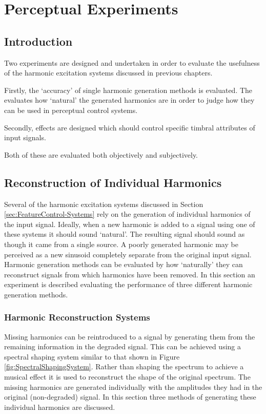 \chapter{Perceptual Experiments}
\label{chap:PerceptualExperiments}

\section{Introduction}
\label{sec:PerceptualExperiments-Introduction}
	\note
	{
		Two experiments are designed and undertaken in order to evaluate the usefulness of the harmonic excitation
		systems discussed in previous chapters.

		Firstly, the `accuracy' of single harmonic generation methods is evaluated. The evaluates how `natural' the
		generated harmonics are in order to judge how they can be used in perceptual control systems.

		Secondly, effects are designed which should control specific timbral attributes of input signals.

		Both of these are evaluated both objectively and subjectively.
	}

\section{Reconstruction of Individual Harmonics}
\label{sec:PerceptualExperiments-Reconstruction}
	Several of the harmonic excitation systems discussed in Section \ref{sec:FeatureControl-Systems} rely on the
	generation of individual harmonics of the input signal. Ideally, when a new harmonic is added to a signal using one
	of these systems it should sound `natural'. The resulting signal should sound as though it came from a single
	source. A poorly generated harmonic may be perceived as a new sinusoid completely separate from the original input
	signal. Harmonic generation methods can be evaluated by how `naturally' they can reconstruct signals from which
	harmonics have been removed. In this section an experiment is described evaluating the performance of three
	different harmonic generation methods.

	\subsection{Harmonic Reconstruction Systems}
	\label{sec:PerceptualExperiments-Reconstruction-Systems}
		Missing harmonics can be reintroduced to a signal by generating them from the remaining information in the
		degraded signal. This can be achieved using a spectral shaping system similar to that shown in Figure
		\ref{fig:SpectralShapingSystem}. Rather than shaping the spectrum to achieve a musical effect it is used to
		reconstruct the shape of the original spectrum. The missing harmonics are generated individually with the
		amplitudes they had in the original (non-degraded) signal. In this section three methods of generating these
		individual harmonics are discussed.

